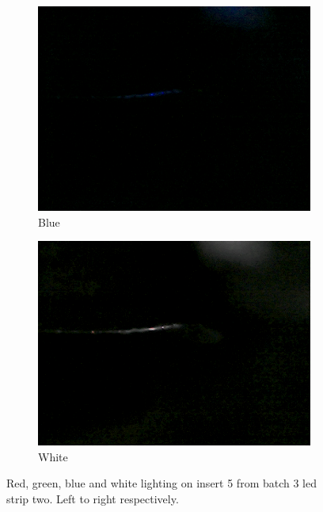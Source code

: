 \begin{figure}
	\hspace*{\fill}
	\begin{subfigure}{0.24\textwidth}
		\includegraphics[width=\linewidth, keepaspectratio=true]{./fig/Vision/Dataset/automated_datasets/2_created_datasets/1_Birthday_dataset/b_003_p_005_b_l_006_blue_B.png}
		\caption{Blue}
	\end{subfigure}
	\hspace*{\fill}
	\begin{subfigure}{0.24\textwidth}
		\includegraphics[width=\linewidth, keepaspectratio=true]{./fig/Vision/Dataset/automated_datasets/2_created_datasets/1_Birthday_dataset/b_003_p_005_b_l_006_white_B.png}
		\caption{White}
	\end{subfigure}
\caption{Red, green, blue and white lighting on insert 5 from batch 3 led strip two. Left to right respectively.}


\end{figure}


